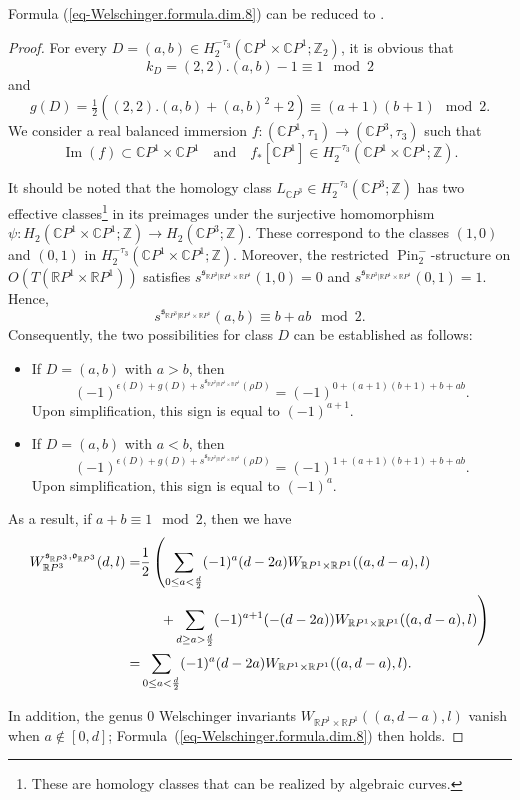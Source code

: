 \documentclass[11pt]{amsart}
\numberwithin{equation}{section}
\theoremstyle{definition}
\theoremstyle{plain}
\theoremstyle{remark}
\newcommand{\R}{\mathbb{R}}
\newcommand{\Z}{\mathbb{Z}}
\newcommand{\C}{\mathbb{C}}
\newcommand{\pp}{\mathbb{C}P^1\times \mathbb{C}P^1}
\DeclareMathOperator{\Pin}{Pin}
\renewcommand{\Im}{\operatorname{Im}}
\begin{document}
Formula (\ref{eq-Welschinger.formula.dim.8}) can be reduced to \cite[Theorem 1]{brugalle2016pencils}.

\begin{proof}
  For every $D=(a,b)\in H_2^{-\tau_3}(\pp;\Z_2)$, it is obvious that
$$k_D=(2,2).(a,b)-1\equiv 1 \mod 2$$
and 
$$g(D)=\tfrac{1}{2}((2,2).(a,b)+(a,b)^2+2)\equiv (a+1)(b+1) \mod 2.$$
We consider a real balanced immersion $f\colon (\C P^1,\tau_1) \to (\C P^3,\tau_3)$ such that 
$$\Im(f)\subset \pp \quad \text{and}\quad f_*[\C P^1]\in H_2^{-\tau_3}(\pp;\Z).$$

It should be noted that the homology class $L_{\C P^3} \in H_2^{-\tau_3}(\C P^3;\Z)$ has two effective classes\footnote{These are homology classes that can be realized by algebraic curves.} in its preimages under the surjective homomorphism $\psi\colon H_2(\pp;\Z)\to H_2(\C P^3;\Z)$. These correspond to the classes $(1,0)$ and $(0,1)$ in $H_2^{-\tau_3}(\pp;\Z)$. Moreover, the restricted $\Pin^-_2$-structure  on $O(T (\R P^1\times \R P^1))$  satisfies  $s^{\mathfrak{s}_{\R P^3|\R P^1\times \R P^1}}(1,0)=0$ and  $s^{\mathfrak{s}_{\R P^3|\R P^1\times \R P^1}}(0,1)=1$. Hence,
$$s^{\mathfrak{s}_{\R P^3|\R P^1\times \R P^1}}(a,b) \equiv b+ab \mod 2.$$
Consequently, the two possibilities for class $D$ can be established as follows: 
\begin{itemize}
    \item If $D=(a,b)$ with $a>b$, then
$$(-1)^{\epsilon(D)+g(D)+s^{\mathfrak{s}_{\R P^3|\R P^1\times \R P^1}}(\rho D)}=(-1)^{0+(a+1)(b+1)+b+ab}.$$
Upon simplification, this sign is equal to $(-1)^{a+1}$.
    \item If $D=(a,b)$ with $a<b$, then
$$(-1)^{\epsilon(D)+g(D)+s^{\mathfrak{s}_{\R P^3|\R P^1\times \R P^1}}(\rho D)}=(-1)^{1+(a+1)(b+1)+b+ab}.$$
Upon simplification, this sign is equal to $(-1)^{a}$.
\end{itemize}
As a result, if $a+b \equiv 1 \mod 2$, then we have
\begin{align*}
     W_{\R P^3}^{\mathfrak{s}_{\R P^3},\mathfrak{o}_{\R P^3}}(d,l)
    = & \frac{1}{2}\left(\sum_{0\leq a<\frac{d}{2}}(-1)^{a} (d-2a) W_{\R P^1\times \R P^1} ((a,d-a),l)\right.\\
    &\hphantom{\frac{1}{2}\Big(}\left. + \sum_{d\geq a>\frac{d}{2}}(-1)^{a+1} (-(d-2a)) W_{\R P^1\times \R P^1} ((a,d-a),l) \right)\\
    = & \sum_{0\leq a<\frac{d}{2}}(-1)^{a} (d-2a) W_{\R P^1\times \R P^1} ((a,d-a),l).
\end{align*}

In addition, the genus $0$ Welschinger invariants $ W_{\R P^1\times \R P^1} ((a,d-a),l)$ vanish when $a \notin [0,d]$; Formula~(\ref{eq-Welschinger.formula.dim.8}) then holds.
\end{proof}
\end{document}
